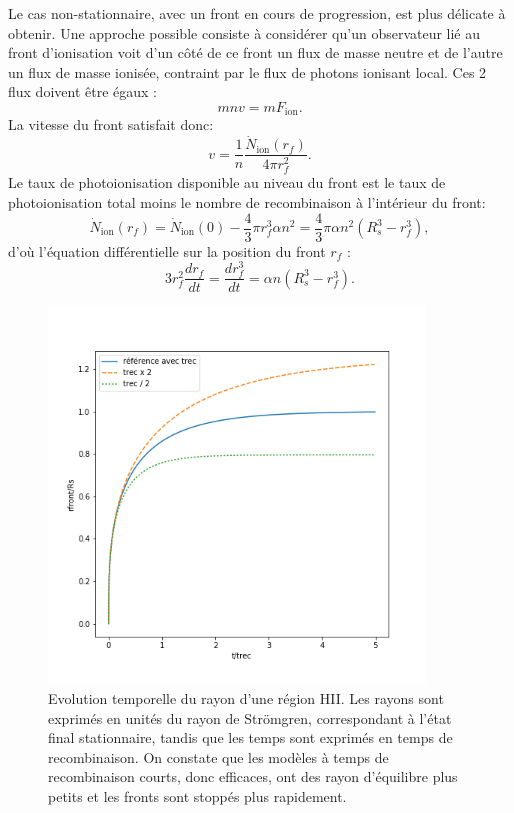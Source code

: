 Le cas non-stationnaire, avec un front en cours de progression, est plus délicate à obtenir. Une approche possible consiste à considérer qu'un observateur lié au front d'ionisation voit d'un côté de ce front un flux de masse neutre et de l'autre un flux de masse ionisée, contraint par le flux de photons ionisant local. Ces 2 flux doivent être égaux :
\begin{equation}
m n v = m F_\mathrm{ion}.
\end{equation}
La vitesse du front satisfait donc:
\begin{equation}
v=\frac{1}{n}\frac{\dot N_\mathrm{ion}(r_f)}{4\pi r_f^2}.
\end{equation}
Le taux de photoionisation disponible au niveau du front est le taux de photoionisation total moins le nombre de recombinaison à l'intérieur du front:
\begin{equation}
\dot N_\mathrm{ion}(r_f)=\dot N_\mathrm{ion}(0)-\frac{4}{3}\pi r_f^3\alpha n^2=\frac{4}{3}\pi \alpha n^2 (R_s^3-r_f^3),
\end{equation}
d'où l'équation différentielle sur la position du front $r_f$ :
\begin{equation}
3r_f^2\frac{d r_f}{dt}=\frac{dr_f^3}{dt}=\alpha n  (R_s^3-r_f^3).
\end{equation}

\begin{figure}[htbp]
	\centering
		\includegraphics[height=10cm]{figs/strom.png}
		\caption[Evolution temporelle de la position d'un front ionisant]{Evolution temporelle du rayon d'une région HII. Les rayons sont exprimés en unités du rayon de Strömgren, correspondant à l'état final stationnaire, tandis que les temps sont exprimés en temps de recombinaison. On constate que les modèles à temps de recombinaison courts, donc efficaces, ont des rayon d'équilibre plus petits et les fronts sont stoppés plus rapidement.}
	\label{f:strom}
\end{figure}

